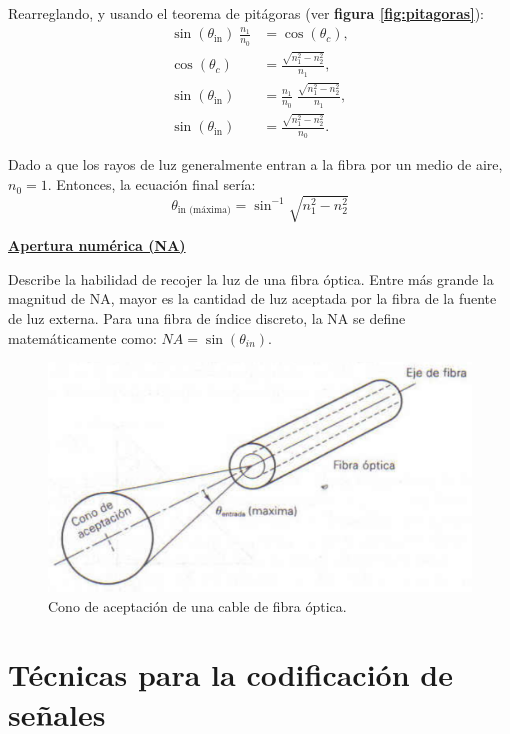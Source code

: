 \documentclass[10pt,a4paper]{article}
\begin{document}
Rearreglando, y usando el teorema de pitágoras (ver \textbf{figura \ref{fig:pitagoras}}):
\begin{align*}
\sin (\theta_\text{in}) \; \frac{n_1}{n_0} &= \cos(\theta_c), \\
\cos (\theta_c) &= \frac{\sqrt{n_1^2 - n_2^2}}{n_1}, \\
\sin (\theta_\text{in}) &= \frac{n_1}{n_0} \; \frac{\sqrt{n_1^2 - n_2^2}}{n_1}, \\
\sin (\theta_\text{in}) &= \frac{\sqrt{n_1^2 - n_2^2}}{n_0}.
\end{align*}

Dado a que los rayos de luz generalmente entran a la fibra por un medio de aire, $n_0=1$. Entonces, la ecuación final sería:
\[\theta_\text{in (máxima)} = \sin^{-1} \sqrt{n_1^2 - n_2^2}\]

\underline{\textbf{Apertura numérica (NA)}}

Describe la habilidad de recojer la luz de una fibra óptica. Entre más grande la magnitud de NA, mayor es la cantidad de luz aceptada por la fibra de la fuente de luz externa. Para una fibra de índice discreto, la NA se define matemáticamente como: $NA = \sin(\theta_{in})$.

\begin{figure}[ht!]
  \caption{Cono de aceptación de una cable de fibra óptica.}
  \label{fig:na}  
  \centerline{
	\includegraphics[width=.8\textwidth-\fboxrule-\fboxrule]{imgs/na.png}}
\end{figure}
 
\section{Técnicas para la codificación de señales}
\end{document}

